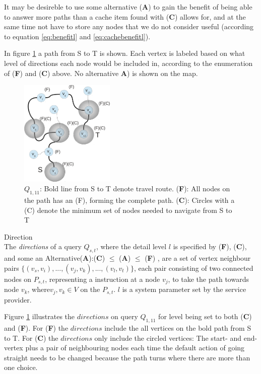 It may be desireble to use some alternative (\textbf{A}) to gain the benefit of being able to answer more paths than a cache item found with (\textbf{C}) allows for, and at the same time not have to store any nodes that we do not consider useful (according to equation \ref{eq:benefitl} and \ref{eq:cachebenefitl}).


In figure \ref{fig:minroute} a path from S to T is shown. Each vertex is labeled based on what level of directions each node would be included in, according to the enumeration of (\textbf{F}) and (\textbf{C}) above. No alternative \textbf{A}) is shown on the map.


\begin{figure}[hbt]
  \center
        \includegraphics[width=0.4\textwidth]{figures/minroute}
        \caption{$Q_{1,11}$: Bold line from S to T denote travel route. (\textbf{F}): All nodes on the path has an (F), forming the complete path. 
        (\textbf{C}): Circles with a (C) denote the minimum set of nodes needed to navigate from S to T}
  \label{fig:minroute}
\end{figure}


\begin{definition}\label{def:direction} {Direction}\\
The \textit{directions} of a query $Q_{s,t}$, where the detail level $l$ is specified by (\textbf{F}), (\textbf{C}), and some an Alternative(\textbf{A}):(\textbf{C}) $\leq$ (\textbf{A}) $\leq$ (\textbf{F}) , are a set of vertex neighbour pairs $\{(v_s,v_i),...,(v_j,v_k),...,(v_l,v_t)\}$, each pair consisting of two connected nodes on $P_{s,t}$, representing a instruction at a node $v_j$, to take the path towards node $v_k$, where$v_j,v_k \in V$ on the \spath $P_{s,t}$.
$l$ is a system parameter set by the service provider.
\end{definition}

Figure \ref{fig:minroute} illustrates the $directions$ on query $Q_{1,11}$ for level being set to both (\textbf{C}) and (\textbf{F}). For (\textbf{F}) the $directions$ include the all vertices on the bold path from S to T. For (\textbf{C}) the $directions$ only include the circled vertices: The start- and end-vertex plus a pair of neighbouring nodes each time the default action of going straight needs to be changed because the path turns where there are more than one choice.

